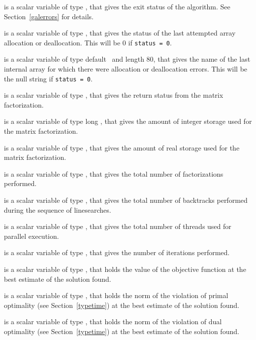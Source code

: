 \begin{description}

 is a scalar variable of type \integer, that gives the
exit status of the algorithm.
See Section~\ref{galerrors}
for details.

 is a scalar variable of type \integer, that gives
the status of the last attempted array allocation or deallocation.
This will be 0 if {\tt status = 0}.

 is a scalar variable of type default \character\
and length 80, that  gives the name of the last internal array
for which there were allocation or deallocation errors.
This will be the null string if {\tt status = 0}.

 is a scalar variable of type \integer, that
gives the return status from the matrix factorization.

 is a scalar variable of type long
\integer, that gives the amount of integer storage used for the matrix
factorization.

 is a scalar variable of type \longinteger,
that gives the amount of real storage used for the matrix factorization.

 is a scalar variable of type \integer, that gives the
total number of factorizations performed.

 is a scalar variable of type \integer, that gives the
total number of backtracks performed during the sequence of linesearches.

 is a scalar variable of type \integer, that gives the
total number of threads used for parallel execution.

 is a scalar variable of type \integer, that
gives the number of iterations performed.

 is a scalar variable of type \realdp, that holds the
value of the objective function at the best estimate of the solution found.

 is a scalar variable of type \realdp,
that holds the norm of the violation of primal optimality
(see Section~\ref{typetime}) at the best estimate of the solution found.

 is a scalar variable of type \realdp,
that holds the norm of the violation of dual optimality
(see Section~\ref{typetime}) at the best estimate of the solution found.


\end{description}
